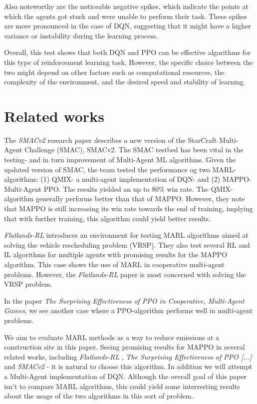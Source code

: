 \documentclass[conference]{IEEEtran}
\begin{document}
Also noteworthy are the noticeable negative spikes, which indicate the points at which the agents got
stuck and were unable to perform their task. These spikes are more pronounced in the case of DQN,
suggesting that it might have a higher variance or instability during the learning process.

Overall, this test shows that both DQN and PPO can be effective algorithms for this type of reinforcement
learning task. However, the specific choice between the two might depend on other factors such as
computational resources, the complexity of the environment, and the desired speed and stability of
learning.




\section{Related works}
The \textit{SMACv2} \cite{ellis2022smacv2} research paper describes a new version of the StarCraft Multi-Agent
Challenge (SMAC), SMACv2. The SMAC testbed has been vital in the testing- and in turn improvement
of Multi-Agent ML algorithms. Given the updated version of SMAC, the team tested the performance og two
MARL- algorithms: (1) QMIX- a multi-agent implementation of DQN- and (2) MAPPO- Multi-Agent PPO. The
results yielded an up to 80\% win rate. The QMIX-algorithm generally performs better than that of MAPPO.
However, they note that MAPPO is still increasing its win rate towards the end of training, implying
that with further training, this algorithm could yield better results.

\textit{Flatlands-RL} \cite{laurent2021flatland} introduces an environment for testing MARL algorithms aimed at
solving the vehicle rescheduling problem (VRSP). They also test several RL and IL algorithms for
multiple agents with promising results for the MAPPO algorithm. This case shows the use of MARL in cooperative
multi-agent problems. However, the \textit{Flatlands-RL} paper is most concerned with solving the VRSP problem.

In the paper \textit{The Surprising Effectiveness of PPO in Cooperative, Multi-Agent Games}, \cite{yu2022surprising}
we see another case where a PPO-algorithm performs well in multi-agent problems.

We aim to evaluate MARL methods as a way to reduce \coo{} emissions at a construction site in this paper.
Seeing promising results for MAPPO in several related works, including \textit{Flatlands-RL} \cite{laurent2021flatland},
\textit{The Surprising Effectiveness of PPO [...]} \cite{yu2022surprising} and \textit{SMACv2} \cite{ellis2022smacv2}-
it is natural to choose this algorithm. In addition we will attempt a Multi-Agent implementation of DQN. Although the
overall goal of this paper isn't to compare MARL algorithms, this could yield some interresting results about the
usage of the two algorithms in this sort of problem.
\end{document}
